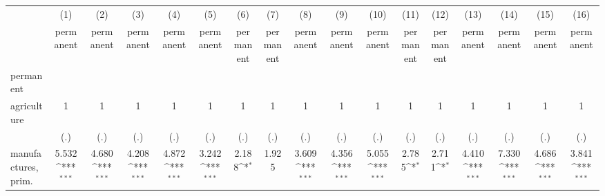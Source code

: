 {
\def\sym#1{\ifmmode^{#1}\else\(^{#1}\)\fi}
\begin{tabular}{l*{16}{c}}
\hline\hline
                    &\multicolumn{1}{c}{(1)}&\multicolumn{1}{c}{(2)}&\multicolumn{1}{c}{(3)}&\multicolumn{1}{c}{(4)}&\multicolumn{1}{c}{(5)}&\multicolumn{1}{c}{(6)}&\multicolumn{1}{c}{(7)}&\multicolumn{1}{c}{(8)}&\multicolumn{1}{c}{(9)}&\multicolumn{1}{c}{(10)}&\multicolumn{1}{c}{(11)}&\multicolumn{1}{c}{(12)}&\multicolumn{1}{c}{(13)}&\multicolumn{1}{c}{(14)}&\multicolumn{1}{c}{(15)}&\multicolumn{1}{c}{(16)}\\
                    &\multicolumn{1}{c}{permanent}&\multicolumn{1}{c}{permanent}&\multicolumn{1}{c}{permanent}&\multicolumn{1}{c}{permanent}&\multicolumn{1}{c}{permanent}&\multicolumn{1}{c}{permanent}&\multicolumn{1}{c}{permanent}&\multicolumn{1}{c}{permanent}&\multicolumn{1}{c}{permanent}&\multicolumn{1}{c}{permanent}&\multicolumn{1}{c}{permanent}&\multicolumn{1}{c}{permanent}&\multicolumn{1}{c}{permanent}&\multicolumn{1}{c}{permanent}&\multicolumn{1}{c}{permanent}&\multicolumn{1}{c}{permanent}\\
\hline
permanent           &                     &                     &                     &                     &                     &                     &                     &                     &                     &                     &                     &                     &                     &                     &                     &                     \\
agriculture         &           1         &           1         &           1         &           1         &           1         &           1         &           1         &           1         &           1         &           1         &           1         &           1         &           1         &           1         &           1         &           1         \\
                    &         (.)         &         (.)         &         (.)         &         (.)         &         (.)         &         (.)         &         (.)         &         (.)         &         (.)         &         (.)         &         (.)         &         (.)         &         (.)         &         (.)         &         (.)         &         (.)         \\
[1em]
manufactures, prim. &       5.532\sym{***}&       4.680\sym{***}&       4.208\sym{***}&       4.872\sym{***}&       3.242\sym{***}&       2.188\sym{*}  &       1.925         &       3.609\sym{***}&       4.356\sym{***}&       5.055\sym{***}&       2.785\sym{*}  &       2.711\sym{*}  &       4.410\sym{***}&       7.330\sym{***}&       4.686\sym{***}&       3.841\sym{***}\\

\end{tabular}}
